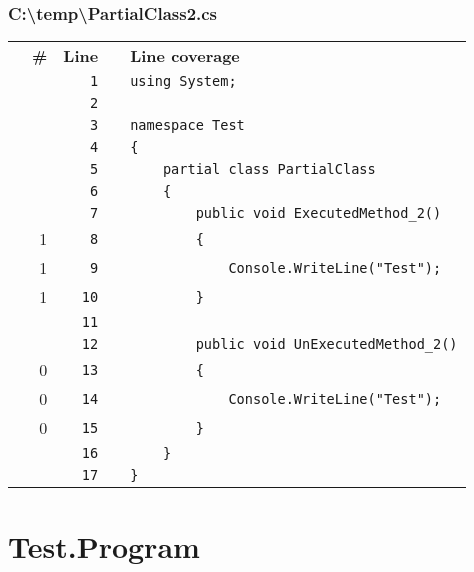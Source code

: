 \documentclass[a4paper,landscape,10pt]{article}
\begin{document}
\subsubsection{C:\textbackslash temp\textbackslash PartialClass2.cs}
\begin{longtable}[l]{lrrll}
\textbf{} & \textbf{\#} & \textbf{Line} & \textbf{} & \textbf{Line coverage}\\
\cellcolor{gray} &  & \verb~1~ & & \verb~using System;~\\
\cellcolor{gray} &  & \verb~2~ & & \verb~~\\
\cellcolor{gray} &  & \verb~3~ & & \verb~namespace Test~\\
\cellcolor{gray} &  & \verb~4~ & & \verb~{~\\
\cellcolor{gray} &  & \verb~5~ & & \verb~    partial class PartialClass~\\
\cellcolor{gray} &  & \verb~6~ & & \verb~    {~\\
\cellcolor{gray} &  & \verb~7~ & & \verb~        public void ExecutedMethod_2()~\\
\cellcolor{green} & 1 & \verb~8~ & & \verb~        {~\\
\cellcolor{green} & 1 & \verb~9~ & & \verb~            Console.WriteLine("Test");~\\
\cellcolor{green} & 1 & \verb~10~ & & \verb~        }~\\
\cellcolor{gray} &  & \verb~11~ & & \verb~~\\
\cellcolor{gray} &  & \verb~12~ & & \verb~        public void UnExecutedMethod_2()~\\
\cellcolor{red} & 0 & \verb~13~ & & \verb~        {~\\
\cellcolor{red} & 0 & \verb~14~ & & \verb~            Console.WriteLine("Test");~\\
\cellcolor{red} & 0 & \verb~15~ & & \verb~        }~\\
\cellcolor{gray} &  & \verb~16~ & & \verb~    }~\\
\cellcolor{gray} &  & \verb~17~ & & \verb~}~\\
\end{longtable}
\newpage
\section{Test.Program}
\end{document}
